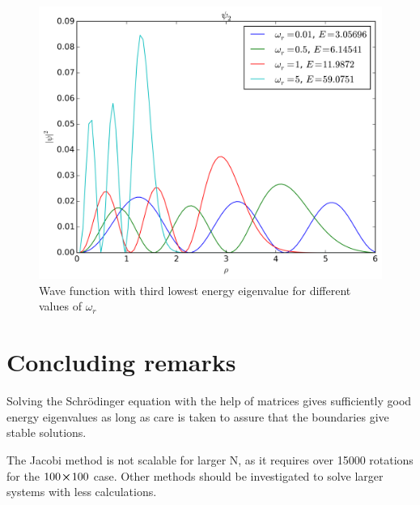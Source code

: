 \documentclass[11pt,a4paper,english,final]{article}
\numberwithin{equation}{section}
\newcommand{\figurewidth}{.85\textwidth}
\begin{document}
\begin{figure}
\centering
\includegraphics[width=\figurewidth]{../results/psi_compare_omegar2.png}
\caption{Wave function with third lowest energy eigenvalue
for different values of $\omega_r$}
\label{fig:omegar2}
\end{figure}




\section{Concluding remarks}

Solving the Schrödinger equation with the help of matrices gives 
sufficiently good energy eigenvalues as long as care is taken to assure 
that the boundaries give stable solutions.

The Jacobi method is not scalable for larger N, as it requires over 15000
rotations for the $100\!\cross\!100$ case. Other methods should be 
investigated to solve larger systems with less calculations.
\end{document}
